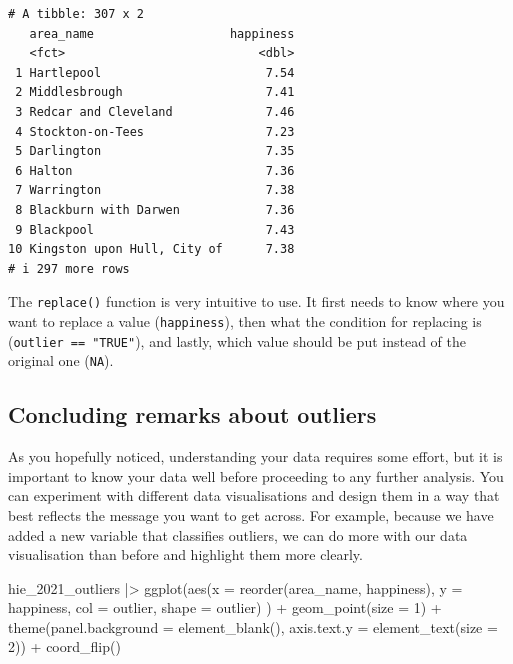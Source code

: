 \documentclass[
  letterpaper,
]{krantz}
\makeatletter
\newenvironment{Shaded}{\begin{snugshade}}{\end{snugshade}}
\newcommand{\AttributeTok}[1]{\textcolor[rgb]{0.40,0.45,0.13}{#1}}
\newcommand{\DecValTok}[1]{\textcolor[rgb]{0.68,0.00,0.00}{#1}}
\newcommand{\FunctionTok}[1]{\textcolor[rgb]{0.28,0.35,0.67}{#1}}
\newcommand{\NormalTok}[1]{\textcolor[rgb]{0.00,0.23,0.31}{#1}}
\newcommand{\SpecialCharTok}[1]{\textcolor[rgb]{0.37,0.37,0.37}{#1}}
\newenvironment{kframe}{%
\medskip{}
\setlength{\fboxsep}{.8em}
 \def\at@end@of@kframe{}%
 \ifinner\ifhmode%
  \def\at@end@of@kframe{\end{minipage}}%
  \begin{minipage}{\columnwidth}%
 \fi\fi%
 \def\FrameCommand##1{\hskip\@totalleftmargin \hskip-\fboxsep
 \colorbox{shadecolor}{##1}\hskip-\fboxsep
     \hskip-\linewidth \hskip-\@totalleftmargin \hskip\columnwidth}%
 \MakeFramed {\advance\hsize-\width
   \@totalleftmargin\z@ \linewidth\hsize
   \@setminipage}}%
 {\par\unskip\endMakeFramed%
 \at@end@of@kframe}
\renewenvironment{Shaded}{\begin{kframe}}{\end{kframe}}
\makeatother
\begin{document}
\begin{verbatim}
# A tibble: 307 x 2
   area_name                   happiness
   <fct>                           <dbl>
 1 Hartlepool                       7.54
 2 Middlesbrough                    7.41
 3 Redcar and Cleveland             7.46
 4 Stockton-on-Tees                 7.23
 5 Darlington                       7.35
 6 Halton                           7.36
 7 Warrington                       7.38
 8 Blackburn with Darwen            7.36
 9 Blackpool                        7.43
10 Kingston upon Hull, City of      7.38
# i 297 more rows
\end{verbatim}

The \texttt{replace()} function is very intuitive to use. It first needs
to know where you want to replace a value (\texttt{happiness}), then
what the condition for replacing is (\texttt{outlier\ ==\ "TRUE"}), and
lastly, which value should be put instead of the original one
(\texttt{NA}).

\subsection{Concluding remarks about
outliers}\label{sec-concluding-remarks-outliers}

As you hopefully noticed, understanding your data requires some effort,
but it is important to know your data well before proceeding to any
further analysis. You can experiment with different data visualisations
and design them in a way that best reflects the message you want to get
across. For example, because we have added a new variable that
classifies outliers, we can do more with our data visualisation than
before and highlight them more clearly.

\begin{Shaded}
\begin{Highlighting}[]
\NormalTok{hie\_2021\_outliers }\SpecialCharTok{|\textgreater{}}
  \FunctionTok{ggplot}\NormalTok{(}\FunctionTok{aes}\NormalTok{(}\AttributeTok{x =} \FunctionTok{reorder}\NormalTok{(area\_name, happiness),}
             \AttributeTok{y =}\NormalTok{ happiness,}
             \AttributeTok{col =}\NormalTok{ outlier,}
             \AttributeTok{shape =}\NormalTok{ outlier)}
\NormalTok{         ) }\SpecialCharTok{+}
  \FunctionTok{geom\_point}\NormalTok{(}\AttributeTok{size =} \DecValTok{1}\NormalTok{) }\SpecialCharTok{+}
  \FunctionTok{theme}\NormalTok{(}\AttributeTok{panel.background =} \FunctionTok{element\_blank}\NormalTok{(),}
        \AttributeTok{axis.text.y =} \FunctionTok{element\_text}\NormalTok{(}\AttributeTok{size =} \DecValTok{2}\NormalTok{)) }\SpecialCharTok{+}
  \FunctionTok{coord\_flip}\NormalTok{()}
\end{Highlighting}
\end{Shaded}
\end{document}
